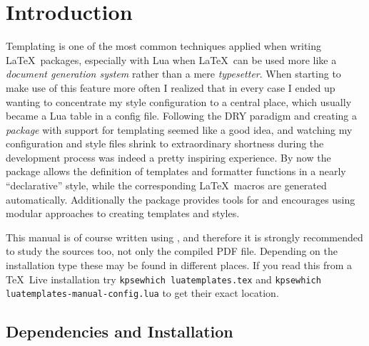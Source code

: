 \documentclass{scrartcl}
\title{\package{luatemplates}}
\subtitle{v0.8}
\author{Urs Liska}
\date{\today}
\begin{document}
\maketitle

\begin{abstract}
 is a Lua\LaTeX\ package to help authors and package
creators with the everyday task of templating.  Its main objectives are:
maintaining the templates in a central location, easily exposing them as \LaTeX\
macros, and assisting with a modular style of programming templates and styles.
\end{abstract}

\tableofcontents

\section{Introduction}

Templating is one of the most common techniques applied when writing \LaTeX\
packages, especially with Lua when \LaTeX\ can be used more like a
\emph{document generation system} rather than a mere \emph{typesetter}.  When
starting to make use of this feature more often I realized that in every case I
ended up wanting to concentrate my style configuration to a central place, which
usually became a Lua table in a config file.  Following the DRY paradigm and
creating a \emph{package} with support for templating seemed like a good idea,
and watching my configuration and style files shrink to extraordinary shortness
during the development process was indeed a pretty inspiring experience.  By now
the package allows the definition of templates and formatter functions in a
nearly “declarative” style, while the corresponding \LaTeX\ macros are generated
automatically. Additionally the package provides tools for and encourages using
modular approaches to creating templates and styles.

This manual is of course written using , and therefore it
is strongly recommended to study the sources too, not only the compiled PDF
file.  Depending on the installation type these may be found in different
places.  If you read this from a \TeX\ Live installation try \texttt{kpsewhich
luatemplates.tex} and \texttt{kpsewhich luatemplates-manual-config.lua} to get
their exact location.

\subsection{Dependencies and Installation}
\end{document}
